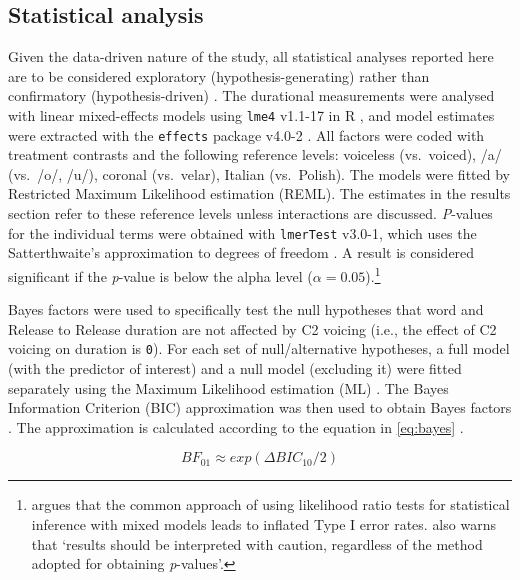 \documentclass[12pt,]{article}
\let\rmarkdownfootnote\footnote%
\def\footnote{\protect\rmarkdownfootnote}
\begin{document}
\hypertarget{statistical-analysis}{%
\subsection{Statistical analysis}\label{statistical-analysis}}

Given the data-driven nature of the study, all statistical analyses
reported here are to be considered exploratory (hypothesis-generating)
rather than confirmatory (hypothesis-driven)
\citep{kerr1998, gelman2013, roettger2018}. The durational measurements
were analysed with linear mixed-effects models using \texttt{lme4}
v1.1-17 in R \citep{bates2015}, and model estimates were extracted with
the \texttt{effects} package v4.0-2 \citep{fox2003}. All factors were
coded with treatment contrasts and the following reference levels:
voiceless (vs.~voiced), /a/ (vs.~/o/, /u/), coronal (vs.~velar), Italian
(vs.~Polish). The models were fitted by Restricted Maximum Likelihood
estimation (REML). The estimates in the results section refer to these
reference levels unless interactions are discussed. \emph{P}-values for
the individual terms were obtained with \texttt{lmerTest} v3.0-1, which
uses the Satterthwaite's approximation to degrees of freedom
\citep{kuznetsova2017, luke2017}. A result is considered significant if
the \emph{p}-value is below the alpha level
(\(\alpha = 0.05\)).\footnote{\citet{luke2017} argues that the common approach of using likelihood ratio tests for statistical inference with mixed models leads to inflated Type I error rates. \citet[1501]{luke2017} also warns that `results should be interpreted with caution, regardless of the method adopted for obtaining \textit{p}-values'.}

Bayes factors were used to specifically test the null hypotheses that
word and Release to Release duration are not affected by C2 voicing
(i.e., the effect of C2 voicing on duration is \texttt{0}). For each set
of null/alternative hypotheses, a full model (with the predictor of
interest) and a null model (excluding it) were fitted separately using
the Maximum Likelihood estimation (ML) \citep[p.~34]{bates2015}. The
Bayes Information Criterion (BIC) approximation was then used to obtain
Bayes factors
\citep{raftery1995, raftery1999, wagenmakers2007, jarosz2014}. The
approximation is calculated according to the equation in \ref{eq:bayes}
\citep[p.~796]{wagenmakers2007}.

\begin{equation}
\label{eq:bayes}
BF_{01} \approx exp(\Delta{}BIC_{10}/2)
\end{equation}
\end{document}
